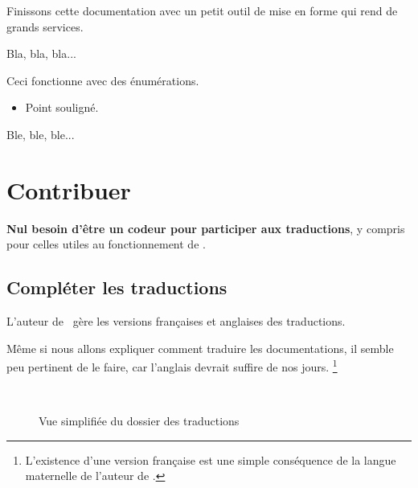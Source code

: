 Finissons cette documentation avec un petit outil de mise en forme qui rend de grands services.


\begin{tdoclatex}[sbs]
Bla, bla, bla...

\tdocsep %

Ceci fonctionne avec des énumérations.

\begin{itemize}
    \item Point souligné.
\end{itemize}

\tdocsep %

Ble, ble, ble...
\end{tdoclatex}


\section{Contribuer}

\begin{tdocnote}
    \textbf{Nul besoin d'être un codeur pour participer aux traductions}, y compris pour celles utiles au fonctionnement de \thisproj.
\end{tdocnote}



\subsection{Compléter les traductions}

\begin{tdocnote}
    L'auteur de \thisproj\ gère les versions françaises et anglaises des traductions.
\end{tdocnote}


\begin{tdoccaut}
    Même si nous allons expliquer comment traduire les documentations, il semble peu pertinent de le faire, car l'anglais devrait suffire de nos jours.%
    \footnote{
        L'existence d'une version française est une simple conséquence de la langue maternelle de l'auteur de \thisproj.
    }
\end{tdoccaut}

\begin{figure}[ht]
    \centering
    \contribtranslatedirtree\
    \caption{Vue simplifiée du dossier des traductions}
    \label{tutodoc-contrib-translate-dir}
\end{figure}


